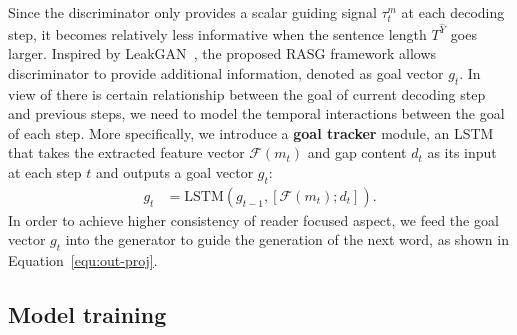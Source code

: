 \documentclass[letterpaper]{article} %
\begin{document}
Since the discriminator only provides a scalar guiding signal $\tau^m_t$ at each decoding step, it becomes relatively less informative when the sentence length $T^{\hat{Y}}$ goes larger.
Inspired by LeakGAN~\cite{Guo2018LongTG}, the proposed RASG framework allows discriminator to provide additional information, denoted as goal vector $g_t$.
In view of there is certain relationship between the goal of current decoding step and previous steps, we need to model the temporal interactions between the goal of each step.
More specifically, we introduce a \textbf{goal tracker} module, an LSTM that takes the extracted feature vector $\mathcal{F}(m_t)$ and gap content $d_t$ as its input at each step $t$ and outputs a goal vector $g_t$:
\begin{align}
    g_t &= \text{LSTM} (g_{t-1}, [\mathcal{F}(m_t); d_t]) .
\end{align}
In order to achieve higher consistency of reader focused aspect, we feed the goal vector $g_t$ into the generator to guide the generation of the next word, as shown in Equation~\ref{equ:out-proj}.

\subsection{Model training}
\end{document}
